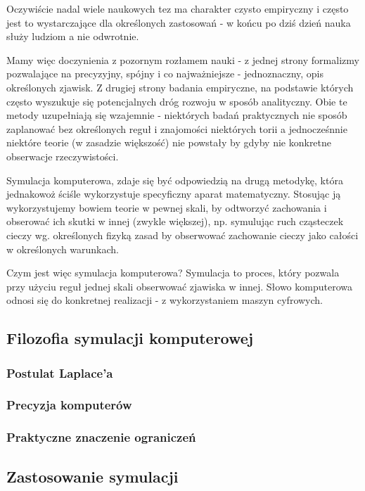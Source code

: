 \par{
Oczywiście nadal wiele naukowych tez ma charakter czysto empiryczny i często jest to wystarczające dla określonych zastosowań - w końcu po dziś dzień nauka służy ludziom a nie odwrotnie.
}

\par{
Mamy więc doczynienia z pozornym rozłamem nauki - z jednej strony formalizmy pozwalające na precyzyjny, spójny i co najważniejsze - jednoznaczny, opis określonych zjawisk. Z drugiej strony badania empiryczne, na podstawie których często wyszukuje się potencjalnych dróg rozwoju w sposób analityczny. Obie te metody uzupełniają się wzajemnie - niektórych badań praktycznych nie sposób zaplanować bez określonych reguł i znajomości niektórych torii a jednocześnnie niektóre teorie (w zasadzie większość) nie powstały by gdyby nie konkretne obserwacje rzeczywistości.
}

\par{
Symulacja komputerowa, zdaje się być odpowiedzią na drugą metodykę, która jednakowoż ściśle wykorzystuje specyficzny aparat matematyczny. Stosując ją wykorzystujemy bowiem teorie w pewnej skali, by odtworzyć zachowania i obserować ich skutki w innej (zwykle większej), np. symulując ruch cząsteczek cieczy wg. określonych fizyką zasad by obserwować zachowanie cieczy jako całości w określonych warunkach.
}

\par{
Czym jest więc symulacja komputerowa? Symulacja to proces, który pozwala przy użyciu reguł jednej skali obserwować zjawiska w innej. Słowo komputerowa odnosi się do konkretnej realizacji - z wykorzystaniem maszyn cyfrowych.
}

\subsection{Filozofia symulacji komputerowej}
\subsubsection{Postulat Laplace'a}
\subsubsection{Precyzja komputerów}
\subsubsection{Praktyczne znaczenie ograniczeń}
\subsection{Zastosowanie symulacji}

